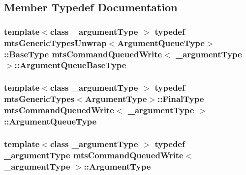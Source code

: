\subsection{Member Typedef Documentation}
\hypertarget{classmts_command_queued_write_a4fe3711262b382c4e23857c2e4f35979}{
\subsubsection[{Argument\-Queue\-Base\-Type}]{\setlength{\rightskip}{0pt plus 5cm}template$<$class \-\_\-argument\-Type $>$ typedef {\bf mts\-Generic\-Types\-Unwrap}$<${\bf Argument\-Queue\-Type}$>$\-::{\bf Base\-Type} {\bf mts\-Command\-Queued\-Write}$<$ \-\_\-argument\-Type $>$\-::{\bf Argument\-Queue\-Base\-Type}}}\label{classmts_command_queued_write_a4fe3711262b382c4e23857c2e4f35979}
\hypertarget{classmts_command_queued_write_a782b598b821585636a6a4f2039368b49}{
\subsubsection[{Argument\-Queue\-Type}]{\setlength{\rightskip}{0pt plus 5cm}template$<$class \-\_\-argument\-Type $>$ typedef {\bf mts\-Generic\-Types}$<${\bf Argument\-Type}$>$\-::Final\-Type {\bf mts\-Command\-Queued\-Write}$<$ \-\_\-argument\-Type $>$\-::{\bf Argument\-Queue\-Type}}}\label{classmts_command_queued_write_a782b598b821585636a6a4f2039368b49}
\hypertarget{classmts_command_queued_write_a2f29807aedb1cbd9293f3f5bfbace404}{
\subsubsection[{Argument\-Type}]{\setlength{\rightskip}{0pt plus 5cm}template$<$class \-\_\-argument\-Type $>$ typedef \-\_\-argument\-Type {\bf mts\-Command\-Queued\-Write}$<$ \-\_\-argument\-Type $>$\-::{\bf Argument\-Type}}}\label{classmts_command_queued_write_a2f29807aedb1cbd9293f3f5bfbace404}
